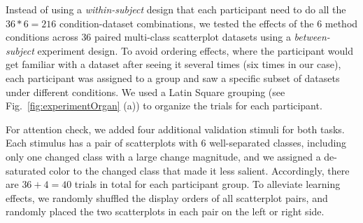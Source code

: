 {\vspace{.3em}
 Instead of using a \emph{within-subject} design that each participant need to do all the $36*6=216$ condition-dataset combinations, we tested the effects of the $6$ method conditions across $36$ paired multi-class scatterplot datasets using a \emph{between-subject} experiment design. To avoid ordering effects, where the participant would get familiar with a dataset after seeing it several times (six times in our case), each participant was assigned to a group and saw a specific subset of datasets under different conditions. We used a Latin Square grouping (see Fig.~\ref{fig:experimentOrgan} (a)) to organize the trials for each participant. %

For attention check, we added four additional validation stimuli for both tasks. Each stimulus has a pair of scatterplots with 6 well-separated classes, including only one changed class with a large change magnitude, and we assigned a de-saturated color to the changed class that made it less salient. Accordingly, there are $36+4 = 40$ trials in total for each participant group. To alleviate learning effects, we randomly shuffled the display orders of all scatterplot pairs, and randomly placed the two scatterplots in each pair on the left or right side.




}
